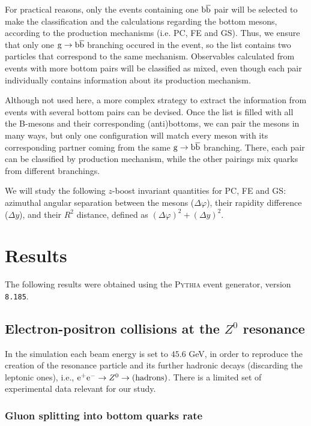 \documentclass[a4paper,12pt]{article}
\begin{document}
For practical reasons, only the events containing one ${\mathrm b}\overline{\mathrm b}$ pair will be selected to make the classification and the calculations regarding  the bottom mesons, according to the production mechanisms (i.e. PC, FE and GS). Thus, we ensure that only one ${\mathrm g}\to{\mathrm b}\overline{\mathrm b}$ branching occured in the event, so the list contains two particles that correspond to the same mechanism. Observables calculated from events with more bottom pairs will be classified as mixed, even though each pair individually contains information about its production mechanism.

Although not used here, a more complex strategy to extract the information from events with several bottom pairs can be devised. Once the list is filled with all the B-mesons and their corresponding (anti)bottoms, we can pair the mesons in many ways, but only one configuration will match every meson with its corresponding partner coming from the same ${\mathrm g}\to{\mathrm b}\overline{\mathrm b}$ branching. There, each pair can be classified by production mechanism, while the other pairings mix quarks from different branchings.

We will study the following $z$-boost invariant quantities for PC, FE and GS: azimuthal angular separation between the mesons ($\Delta\varphi$), their rapidity difference ($\Delta y$), and their $R^2$ distance, defined as $(\Delta\varphi)^2+(\Delta y)^2$.

\section{Results}
\label{sec:results}

The following results were obtained using the \textsc{Pythia} event generator, version \verb|8.185|.

\subsection{Electron-positron collisions at the $Z^0$ resonance}

In the simulation each beam energy is set to $45.6$ GeV, in order to reproduce the creation of the resonance particle and its further hadronic decays (discarding the leptonic ones), i.e., ${\mathrm e}^+{\mathrm e}^-\to Z^0\to \mbox{(hadrons)}$. There is a limited set of experimental data relevant for our study.

\subsubsection{Gluon splitting into bottom quarks rate}
\end{document}
